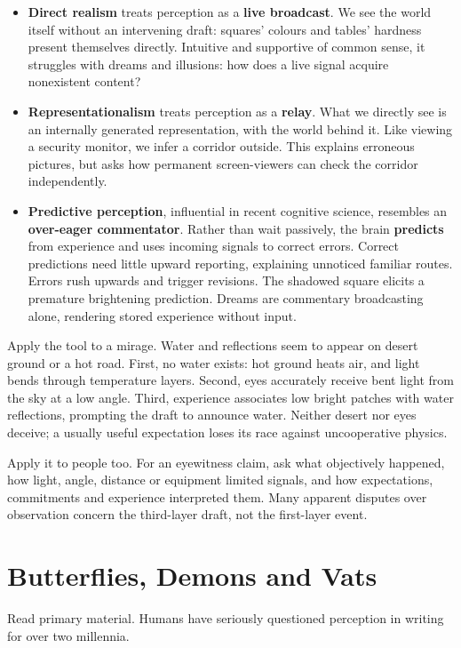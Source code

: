 \begin{itemize}
\item \textbf{Direct realism} treats perception as a \textbf{live broadcast}. We see the world itself without an intervening draft: squares' colours and tables' hardness present themselves directly. Intuitive and supportive of common sense, it struggles with dreams and illusions: how does a live signal acquire nonexistent content?
\item \textbf{Representationalism} treats perception as a \textbf{relay}. What we directly see is an internally generated representation, with the world behind it. Like viewing a security monitor, we infer a corridor outside. This explains erroneous pictures, but asks how permanent screen-viewers can check the corridor independently.
\item \textbf{Predictive perception}, influential in recent cognitive science, resembles an \textbf{over-eager commentator}. Rather than wait passively, the brain \textbf{predicts} from experience and uses incoming signals to correct errors. Correct predictions need little upward reporting, explaining unnoticed familiar routes. Errors rush upwards and trigger revisions. The shadowed square elicits a premature brightening prediction. Dreams are commentary broadcasting alone, rendering stored experience without input.
\end{itemize}
Apply the tool to a mirage. Water and reflections seem to appear on desert ground or a hot road. First, no water exists: hot ground heats air, and light bends through temperature layers. Second, eyes accurately receive bent light from the sky at a low angle. Third, experience associates low bright patches with water reflections, prompting the draft to announce water. Neither desert nor eyes deceive; a usually useful expectation loses its race against uncooperative physics.

Apply it to people too. For an eyewitness claim, ask what objectively happened, how light, angle, distance or equipment limited signals, and how expectations, commitments and experience interpreted them. Many apparent disputes over observation concern the third-layer draft, not the first-layer event.

\section{Butterflies, Demons and Vats}
Read primary material. Humans have seriously questioned perception in writing for over two millennia.

